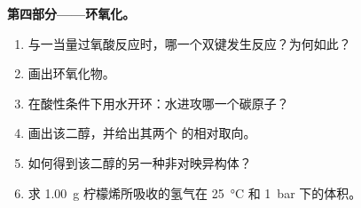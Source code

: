 \begin{problem}
\medskip
\noindent\textbf{第四部分——环氧化。}
\begin{enumerate}[resume]
  \item 与一当量过氧酸反应时，哪一个双键发生反应？为何如此？
  \item 画出环氧化物。
  \item 在酸性条件下用水开环：水进攻哪一个碳原子？
  \item 画出该二醇，并给出其两个  的相对取向。
  \item 如何得到该二醇的另一种非对映异构体？
  \item 求 \qty{1.00}{g} 柠檬烯所吸收的氢气在
        \qty{25}{\degreeCelsius} 和 \qty{1}{bar} 下的体积。
\end{enumerate}
\end{problem}
